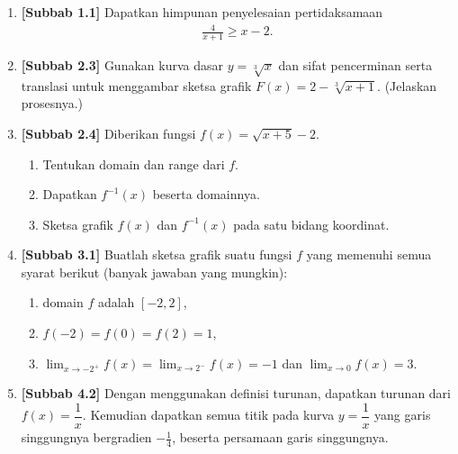\documentclass[10pt,openany,a4paper]{article}
\theoremstyle{definition}
\theoremstyle{definition}
\theoremstyle{plain}
\begin{document}
\begin{enumerate}
    \item \textbf{[Subbab 1.1]} Dapatkan himpunan penyelesaian pertidaksamaan
    \begin{align*}
        \frac{4}{x+1}\geq x-2.
    \end{align*}

    \item \textbf{[Subbab 2.3]} Gunakan kurva dasar $y=\sqrt[3]{x}$ dan sifat pencerminan serta translasi untuk menggambar sketsa grafik $F(x)=2-\sqrt[3]{x+1}$. (Jelaskan prosesnya.)

    \item \textbf{[Subbab 2.4]} Diberikan fungsi $f(x)=\sqrt{x+5}-2$.
    \begin{enumerate}
        \item Tentukan domain dan range dari $f$.
        \item Dapatkan $f^{-1}(x)$ beserta domainnya.
        \item Sketsa grafik $f(x)$ dan $f^{-1}(x)$ pada satu bidang koordinat.
    \end{enumerate}

    \item \textbf{[Subbab 3.1]} Buatlah sketsa grafik suatu fungsi $f$ yang memenuhi semua syarat berikut (banyak jawaban yang mungkin):
    \begin{enumerate}
        \item domain $f$ adalah $[-2,2]$,
        \item $f(-2)=f(0)=f(2)=1$,
        \item $\displaystyle\lim_{x\to -2^+}f(x)=\lim_{x\to 2^-}f(x)=-1$ dan $\displaystyle\lim_{x\to 0}f(x)=3$.
    \end{enumerate}

    \item \textbf{[Subbab 4.2]} Dengan menggunakan definisi turunan, dapatkan turunan dari $f(x)=\dfrac{1}{x}$. Kemudian dapatkan semua titik pada kurva $y=\dfrac{1}{x}$ yang garis singgungnya bergradien $-\frac{1}{4}$, beserta persamaan garis singgungnya.
\end{enumerate}

\newpage
\end{document}

